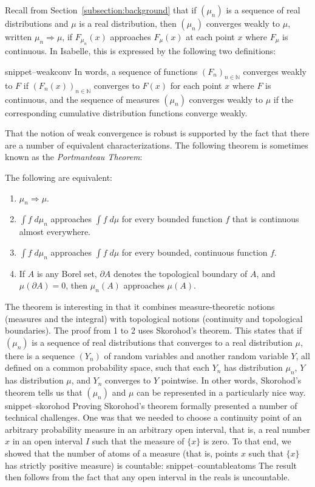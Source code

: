 \documentclass{svjour3}
\newcommand{\NN}{\mathbb{N}}
\newcommand{\Snippet}[1]{\csname snippet--#1\endcsname}
\begin{document}
Recall from Section~\ref{subsection:background} that if $(\mu_n)$ is a sequence of real distributions and $\mu$ is a real distribution, then $(\mu_n)$ converges weakly to $\mu$, written $\mu_n \Rightarrow \mu$, if $F_{\mu_n}(x)$ approaches $F_\mu(x)$ at each point $x$ where $F_\mu$ is continuous. In Isabelle, this is expressed by the following two definitions:

\Snippet{weakconv}
In words, a sequence of functions $(F_n)_{n \in \NN}$ converges weakly to $F$ if $(F_n(x))_{n \in \NN}$ converges to $F(x)$ for each point $x$ where $F$ is continuous, and the sequence of measures $(\mu_n)$ converges weakly to $\mu$ if the corresponding cumulative distribution functions converge weakly.

That the notion of weak convergence is robust is supported by the fact that there are a number of equivalent characterizations. The following theorem is sometimes known as the \emph{Portmanteau Theorem}:
\begin{theorem}
The following are equivalent:
\begin{enumerate}
 \item $\mu_n \Rightarrow \mu$.
 \item $\int f \; d\mu_n$ approaches $\int f \; d\mu$ for every bounded function $f$ that is continuous almost everywhere.
 \item $\int f \; d\mu_n$ approaches $\int f \; d\mu$ for every bounded, continuous function $f$.
 \item If $A$ is any Borel set, $\partial A$ denotes the topological boundary of $A$, and $\mu(\partial A) = 0$, then $\mu_n(A)$ approaches $\mu(A)$.
\end{enumerate}
\end{theorem}
The theorem is interesting in that it combines measure-theoretic notions (measures and the integral) with topological notions (continuity and topological boundaries). The proof from 1 to 2 uses Skorohod's theorem. This states that if $(\mu_n)$ is a sequence of real distributions that converges to a real distribution $\mu$, there is a sequence $(Y_n)$ of random variables and another random variable $Y$, all defined on a common probability space, such that each $Y_n$ has distribution $\mu_n$, $Y$ has distribution $\mu$, and $Y_n$ converges to $Y$ pointwise. In other words, Skorohod's theorem tells us that $(\mu_n)$ and $\mu$ can be represented in a particularly nice way.
\Snippet{skorohod}
Proving Skorohod's theorem formally presented a number of technical challenges. One was that we needed to choose a continuity point of an arbitrary probability measure in an arbitrary open interval, that is, a real number $x$ in an open interval $I$ such that the measure of $\{x\}$ is zero. To that end, we showed that the number of atoms of a measure (that is, points $x$ such that $\{x\}$ has strictly positive measure) is countable:
\Snippet{countableatoms}
The result then follows from the fact that any open interval in the reals is uncountable.
\end{document}
